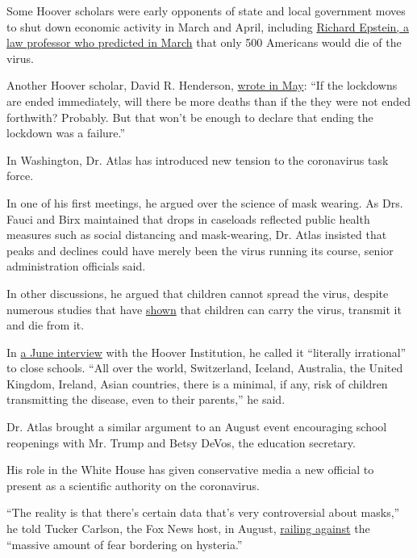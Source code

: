 Some Hoover scholars were early opponents of state and local government
moves to shut down economic activity in March and April, including
\href{https://www.hoover.org/research/coronavirus-pandemic}{Richard
Epstein, a law professor who predicted in March} that only 500 Americans
would die of the virus.

Another Hoover scholar, David R. Henderson,
\href{https://www.hoover.org/research/end-lockdowns-now}{wrote in May}:
``If the lockdowns are ended immediately, will there be more deaths than
if the they were not ended forthwith? Probably. But that won't be enough
to declare that ending the lockdown was a failure.''

In Washington, Dr. Atlas has introduced new tension to the coronavirus
task force.

In one of his first meetings, he argued over the science of mask
wearing. As Drs. Fauci and Birx maintained that drops in caseloads
reflected public health measures such as social distancing and
mask-wearing, Dr. Atlas insisted that peaks and declines could have
merely been the virus running its course, senior administration
officials said.

In other discussions, he argued that children cannot spread the virus,
despite numerous studies that have
\href{https://www.nytimes3xbfgragh.onion/2020/07/30/health/coronavirus-children.html}{shown}
that children can carry the virus, transmit it and die from it.

In
\href{https://www.hoover.org/research/doctor-scott-atlas-and-efficacy-lockdowns-social-distancing-and-closings-1}{a
June interview} with the Hoover Institution, he called it ``literally
irrational'' to close schools. ``All over the world, Switzerland,
Iceland, Australia, the United Kingdom, Ireland, Asian countries, there
is a minimal, if any, risk of children transmitting the disease, even to
their parents,'' he said.

Dr. Atlas brought a similar argument to an August event encouraging
school reopenings with Mr. Trump and Betsy DeVos, the education
secretary.

His role in the White House has given conservative media a new official
to present as a scientific authority on the coronavirus.

``The reality is that there's certain data that's very controversial
about masks,'' he told Tucker Carlson, the Fox News host, in August,
\href{https://video.foxnews.com/v/6180318434001\#sp=show-clips}{railing
against} the ``massive amount of fear bordering on hysteria.''

